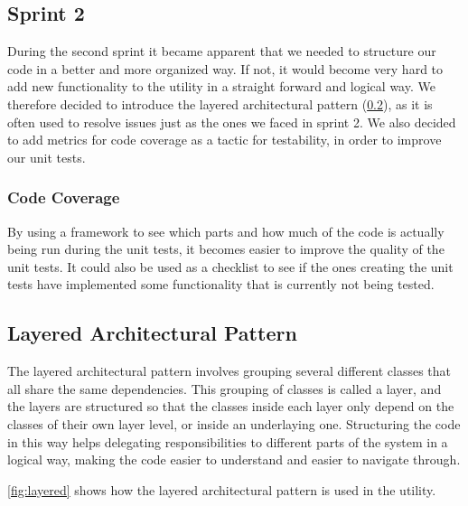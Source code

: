 \subsection{Sprint 2}
During the second sprint it became apparent that we needed to structure our code in a better and more organized way. If not, it would become very hard to add new functionality to the \gls{utility} in a straight forward and logical way. We therefore decided to introduce the layered architectural pattern (\ref{sec:Layered}), as it is often used to resolve issues just as the ones we faced in sprint 2. We also decided to add metrics for code coverage as a tactic for testability, in order to improve our unit tests.

\subsubsection{Code Coverage}
By using a framework to see which parts and how much of the code is actually being run during the unit tests, it becomes easier to improve the quality of the unit tests. It could also be used as a checklist to see if the ones creating the unit tests have implemented some functionality that is currently not being tested.

\subsection{Layered Architectural Pattern}
\label{sec:Layered}
The layered architectural pattern involves grouping several different classes that all share the same dependencies. This grouping of classes is called a layer, and the layers are structured so that the classes inside each layer only depend on the classes of their own layer level, or inside an underlaying one. Structuring the code in this way helps delegating responsibilities to different parts of the system in a logical way, making the code easier to understand and easier to navigate through.

\autoref{fig:layered} shows how the layered architectural pattern is used in the \gls{utility}.

